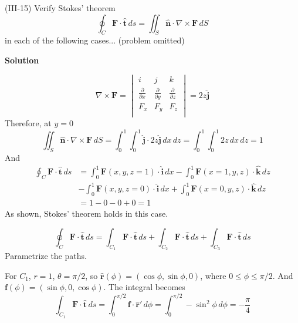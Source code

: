 \documentclass{article}
\begin{document}

\begin{homeworkProblem}
	(III-15) Verify Stokes' theorem
	\[
		\oint_C\mathbf{F}\cdot\hat{\mathbf{t}}\,ds=\iint_S\hat{\mathbf{n}}\cdot\nabla\times\mathbf{F}\,dS
	\]
	in each of the following cases... (problem omitted)

	\textbf{Solution}
	\begin{enumerate}[label=(\alph*)]
		\begin{item}
		 	\[
			 	\nabla\times\mathbf{F}=\begin{vmatrix}
			 		i & j & k \\
			 		\frac{\partial}{\partial x} & \frac{\partial}{\partial y} & \frac{\partial}{\partial z} \\
			 		F_x & F_y & F_z \\
			 	\end{vmatrix}=2z\hat{\mathbf{j}}
		 	\]
		 	Therefore, at $y=0$
		 	\[
			 	\iint_S\hat{\mathbf{n}}\cdot\nabla\times\mathbf{F}\,dS=\int_0^1\int_0^1\hat{\mathbf{j}}\cdot2z\hat{\mathbf{j}}\,dx\,dz=\int_0^1\int_0^1 2z\,dx\,dz=1
		 	\]
		 	And
		 	\begin{align*}
				\oint_C\mathbf{F}\cdot\hat{\mathbf{t}}\,ds&=\int_0^1\mathbf{F}(x,y,z=1)\cdot\hat{\mathbf{i}}\,dx-\int_0^1\mathbf{F}(x=1,y,z)\cdot\hat{\mathbf{k}}\,dz \\
				&-\int_0^1\mathbf{F}(x,y,z=0)\cdot\hat{\mathbf{i}}\,dx+\int_0^1\mathbf{F}(x=0,y,z)\cdot\hat{\mathbf{k}}\,dz \\
				&=1-0-0+0=1
			\end{align*}
			As shown, Stokes' theorem holds in this case.
		\end{item}
		\begin{item}
			\[
				\oint_C\mathbf{F}\cdot\hat{\mathbf{t}}\,ds=\int_{C_1}\mathbf{F}\cdot\hat{\mathbf{t}}\,ds+\int_{C_2}\mathbf{F}\cdot\hat{\mathbf{t}}\,ds+\int_{C_3}\mathbf{F}\cdot\hat{\mathbf{t}}\,ds
			\]
			Parametrize the paths.

			For $C_1$, $r=1$, $\theta=\pi/2$, so $\hat{\mathbf{r}}(\phi)=(\cos\phi,\sin\phi,0)$, where $0\leq\phi\leq\pi/2$. And $\mathbf{f}(\phi)=(\sin\phi,0,\cos\phi)$. The integral becomes
			\[
				\int_{C_1}\mathbf{F}\cdot\hat{\mathbf{t}}\,ds=\int_0^{\pi/2}\mathbf{f}\cdot\hat{\mathbf{r}}'\,d\phi=\int_0^{\pi/2}-\sin^2\phi\,d\phi=-\frac{\pi}{4}
			\]


\end{item}
\end{enumerate}
\end{homeworkProblem}
\end{document}
